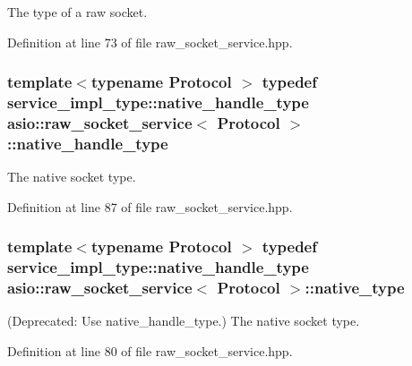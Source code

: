 The type of a raw socket. 



Definition at line 73 of file raw\+\_\+socket\+\_\+service.\+hpp.

\hypertarget{classasio_1_1raw__socket__service_a79802711654c4d649ff11b7fe238b927}{}
\subsubsection[{native\+\_\+handle\+\_\+type}]{\setlength{\rightskip}{0pt plus 5cm}template$<$typename Protocol $>$ typedef {\bf service\+\_\+impl\+\_\+type\+::native\+\_\+handle\+\_\+type} {\bf asio\+::raw\+\_\+socket\+\_\+service}$<$ Protocol $>$\+::{\bf native\+\_\+handle\+\_\+type}}\label{classasio_1_1raw__socket__service_a79802711654c4d649ff11b7fe238b927}


The native socket type. 



Definition at line 87 of file raw\+\_\+socket\+\_\+service.\+hpp.

\hypertarget{classasio_1_1raw__socket__service_ac593d0ef0d19e36b2226e91476fd6566}{}
\subsubsection[{native\+\_\+type}]{\setlength{\rightskip}{0pt plus 5cm}template$<$typename Protocol $>$ typedef {\bf service\+\_\+impl\+\_\+type\+::native\+\_\+handle\+\_\+type} {\bf asio\+::raw\+\_\+socket\+\_\+service}$<$ Protocol $>$\+::{\bf native\+\_\+type}}\label{classasio_1_1raw__socket__service_ac593d0ef0d19e36b2226e91476fd6566}


(Deprecated\+: Use native\+\_\+handle\+\_\+type.) The native socket type. 



Definition at line 80 of file raw\+\_\+socket\+\_\+service.\+hpp.

\hypertarget{classasio_1_1raw__socket__service_a7d559e265719280febe97fe07fbb524d}{}
